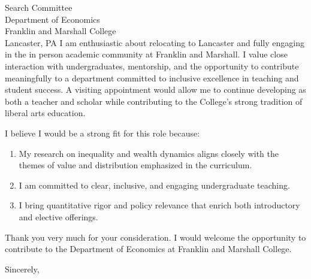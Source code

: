 \documentclass[11pt,letterpaper]{letter}
\begin{document}
\begin{letter}{
Search Committee \\
Department of Economics \\
Franklin and Marshall College \\
Lancaster, PA
}
I am enthusiastic about relocating to Lancaster and fully engaging in the in person academic community at Franklin and Marshall. I value close interaction with undergraduates, mentorship, and the opportunity to contribute meaningfully to a department committed to inclusive excellence in teaching and student success. A visiting appointment would allow me to continue developing as both a teacher and scholar while contributing to the College’s strong tradition of liberal arts education.

I believe I would be a strong fit for this role because:
\begin{enumerate}
    \item My research on inequality and wealth dynamics aligns closely with the themes of value and distribution emphasized in the curriculum.
    \item I am committed to clear, inclusive, and engaging undergraduate teaching.
    \item I bring quantitative rigor and policy relevance that enrich both introductory and elective offerings.
\end{enumerate}

Thank you very much for your consideration. I would welcome the opportunity to contribute to the Department of Economics at Franklin and Marshall College.

\closing{Sincerely,}

\end{letter}
\end{document}
